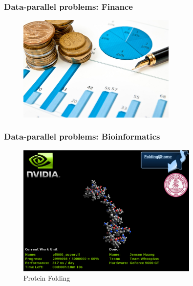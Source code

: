 \documentclass{beamer}
\begin{document}
\begin{frame}
  \frametitle{Data-parallel problems: Finance}
  \begin{figure}
    \centering
    \includegraphics[width=0.7\textwidth]{graphics/finance.jpg}
\label{fig:gpufinance}
\end{figure}
\end{frame}
\begin{frame}
  \frametitle{Data-parallel problems: Bioinformatics}
  \begin{figure}
    \centering
    \includegraphics[width=0.8\textwidth]{graphics/fah_clientGeForce9600GT.png}
    \caption{Protein Folding}
\label{fig:foldingathome}
\end{figure}


\end{frame} 
\end{document}
